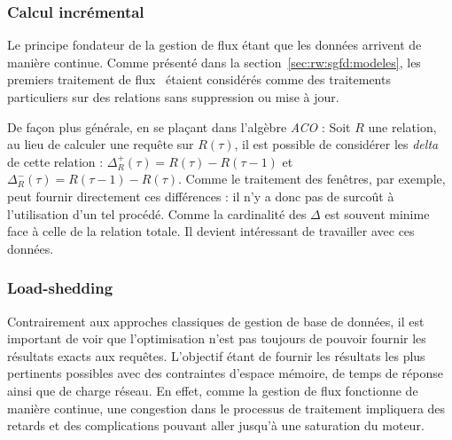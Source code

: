\subsubsection{Calcul incrémental}
Le principe fondateur de la gestion de flux étant que les données arrivent de manière continue. Comme présenté dans la section~\ref{sec:rw:sgfd:modeles}, les premiers traitement de flux~\cite{Terry:tapestry} étaient considérés comme des traitements particuliers sur des relations sans suppression ou mise à jour.

De façon plus générale, en se plaçant dans l'algèbre \textit{ACO} : Soit $R$ une relation, au lieu de calculer une requête sur $R(\tau)$, il est possible de considérer les \textit{delta} de cette relation : $\Delta_R^+(\tau) = R(\tau)-R(\tau-1)$ et $\Delta_R^-(\tau) = R(\tau-1)-R(\tau)$. Comme le traitement des fenêtres, par exemple, peut fournir directement ces différences : il n'y a donc pas de surcoût à l'utilisation d'un tel procédé. Comme la cardinalité des $\Delta$ est souvent minime face à celle de la relation totale. Il devient intéressant de travailler avec ces données.
\subsubsection{Load-shedding}
Contrairement aux approches classiques de gestion de base de données, il est important de voir que l'optimisation n'est pas toujours de pouvoir fournir les résultats exacts aux requêtes. L'objectif étant de fournir les résultats les plus pertinents possibles avec des contraintes d'espace mémoire, de temps de réponse ainsi que de charge réseau. En effet, comme la gestion de flux fonctionne de manière continue, une congestion dans le processus de traitement impliquera des retards et des complications pouvant aller jusqu'à une saturation du moteur.

